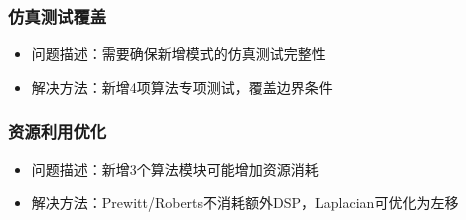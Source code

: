 \subsubsection{仿真测试覆盖}

\begin{itemize}
    \item 问题描述：需要确保新增模式的仿真测试完整性
    \item 解决方法：新增4项算法专项测试，覆盖边界条件
\end{itemize}



\subsubsection{资源利用优化}

\begin{itemize}
    \item 问题描述：新增3个算法模块可能增加资源消耗
    \item 解决方法：Prewitt/Roberts不消耗额外DSP，Laplacian可优化为左移
\end{itemize}
